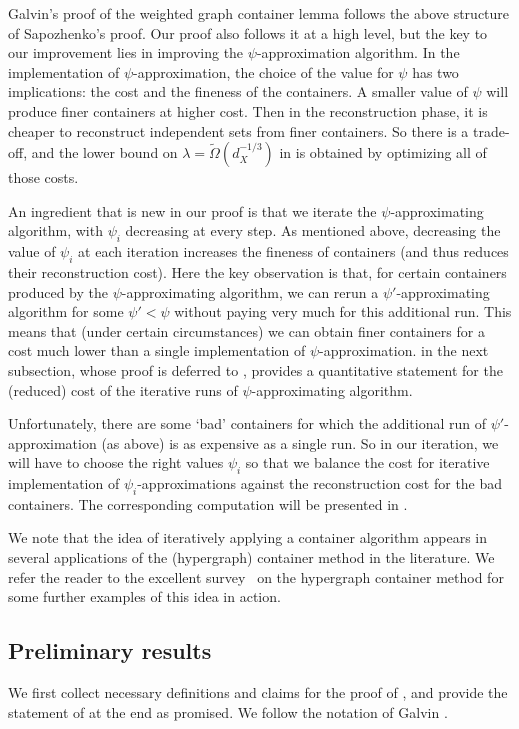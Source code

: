 \documentclass[a4paper]{amsart}
\theoremstyle{definition}
\newcommand{\0}[0]{\emptyset}
\begin{document}
Galvin's proof \cite{galvin_threshold} of the weighted graph container lemma follows the above structure of Sapozhenko's proof. Our proof also follows it at a high level, but the key to our improvement lies in improving the $\psi$-approximation algorithm. In the implementation of $\psi$-approximation, the choice of the value for $\psi$ has two implications: the cost and the fineness of the containers. A smaller value of $\psi$ will produce finer containers at higher cost. Then in the reconstruction phase, it is cheaper to reconstruct independent sets from finer containers. So there is a trade-off, and the lower bound on $\lambda=\tilde \Omega(d_X^{-1/3})$ in \cite{galvin_threshold} is obtained by optimizing all of those costs.

An ingredient that is new in our proof is that we iterate the $\psi$-approximating algorithm, with $\psi_i$ decreasing at every step. As mentioned above, decreasing the value of $\psi_i$ at each iteration increases the fineness of containers (and thus reduces their reconstruction cost). Here the key observation is that, for certain containers produced by the $\psi$-approximating algorithm, we can rerun a $\psi'$-approximating algorithm for some $\psi'<\psi$ without paying very much for this additional run. This means that (under certain circumstances) we can obtain finer containers for a cost much lower than a single implementation of $\psi$-approximation.  in the next subsection, whose proof is deferred to , provides a quantitative statement for the (reduced) cost of the iterative runs of $\psi$-approximating algorithm. 

Unfortunately, there are some `bad' containers for which the additional run of $\psi'$-approximation (as above) is as expensive as a single run. So in our iteration, we will have to choose the right values $\psi_i$ so that we balance the cost for iterative implementation of $\psi_i$-approximations against the reconstruction cost for the bad containers. The corresponding computation will be presented in  .

We note that the idea of iteratively applying a container algorithm appears in several applications of the (hypergraph) container method in the literature. We refer the reader to the excellent survey~\cite{balogh2018method} on the hypergraph container method for some further examples of this idea in action. 

\subsection{Preliminary results}
We first collect necessary definitions and claims for the proof of , and provide the statement of  at the end as promised. We follow the notation of Galvin \cite{Galvin_independent}.
\end{document}

